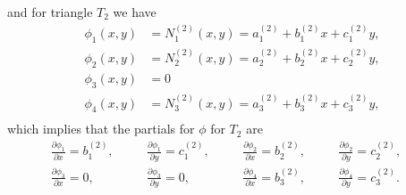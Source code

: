 \documentclass[12pt]{article}
\begin{document}
and for triangle $T_2$ we have
\begin{equation}
  \label{eq:1_t2_phi}
  \begin{aligned}
    \phi_1(x,y) &= N_1^{(2)}(x,y) =
    a_1^{(2)} + b_1^{(2)}x + c_1^{(2)}y,\\ 
    \phi_2(x,y) &= N_2^{(2)}(x,y) =
    a_2^{(2)} + b_2^{(2)}x + c_2^{(2)}y,\\ 
    \phi_3(x,y) &= 0 \\
    \phi_4(x,y) &= N_3^{(2)}(x,y) =
    a_3^{(2)} + b_3^{(2)}x + c_3^{(2)}y,\\
  \end{aligned}
\end{equation}
which implies that the partials for $\phi$ for $T_2$ are
\begin{equation}
  \label{eq:1_t2_dphi}
  \begin{aligned}
    &\frac{\partial\phi_1}{\partial x} = b_1^{(2)},&\quad
    &\frac{\partial\phi_1}{\partial y} = c_1^{(2)},&\quad
    &\frac{\partial\phi_2}{\partial x} = b_2^{(2)},&\quad
    &\frac{\partial\phi_2}{\partial y} = c_2^{(2)},&\quad \\
    &\frac{\partial\phi_3}{\partial x} = 0,&\quad
    &\frac{\partial\phi_3}{\partial y} = 0,&\quad
    &\frac{\partial\phi_4}{\partial x} = b_3^{(2)},&\quad
    &\frac{\partial\phi_4}{\partial y} = c_3^{(2)}.&\quad
  \end{aligned}
\end{equation}
\end{document}
